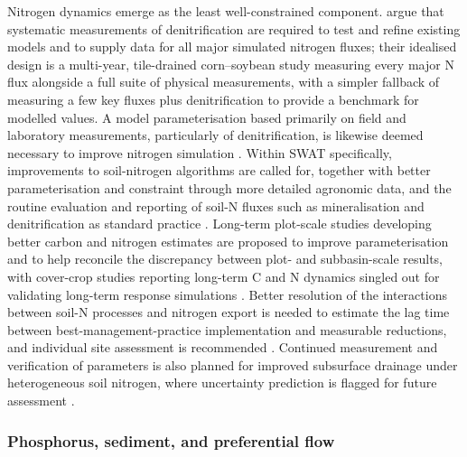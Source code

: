 Nitrogen dynamics emerge as the least well-constrained component. \textcite{David2009} argue that systematic measurements of denitrification are required to test and refine existing models and to supply data for all major simulated nitrogen fluxes; their idealised design is a multi-year, tile-drained corn--soybean study measuring every major N flux alongside a full suite of physical measurements, with a simpler fallback of measuring a few key fluxes plus denitrification to provide a benchmark for modelled values. A model parameterisation based primarily on field and laboratory measurements, particularly of denitrification, is likewise deemed necessary to improve nitrogen simulation \parencite{Salazar2009}. Within SWAT specifically, improvements to soil-nitrogen algorithms are called for, together with better parameterisation and constraint through more detailed agronomic data, and the routine evaluation and reporting of soil-N fluxes such as mineralisation and denitrification as standard practice \parencite{Ikenberry2017}. Long-term plot-scale studies developing better carbon and nitrogen estimates are proposed to improve parameterisation and to help reconcile the discrepancy between plot- and subbasin-scale results, with cover-crop studies reporting long-term C and N dynamics singled out for validating long-term response simulations \parencite{Singer2011}. Better resolution of the interactions between soil-N processes and nitrogen export is needed to estimate the lag time between best-management-practice implementation and measurable reductions, and individual site assessment is recommended \parencite{Law2022}. Continued measurement and verification of parameters is also planned for improved subsurface drainage under heterogeneous soil nitrogen, where uncertainty prediction is flagged for future assessment \parencite{Tao2021}.

\subsubsection{Phosphorus, sediment, and preferential flow}

